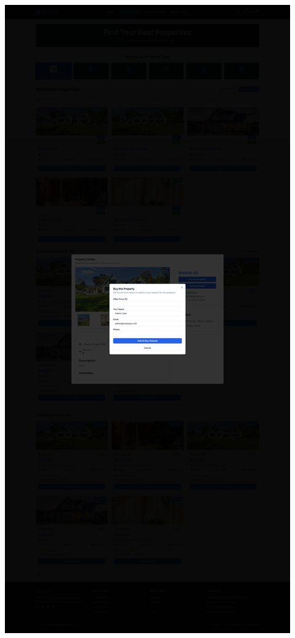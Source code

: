 \documentclass[conference]{IEEEtran}
\begin{document}
\begin{center}
\noindent
\begin{minipage}[t]{0.45\textwidth}
\includegraphics[width=\linewidth]{Project Screenshot/Property Details.png}

\end{minipage}
\end{center}
\end{document}
